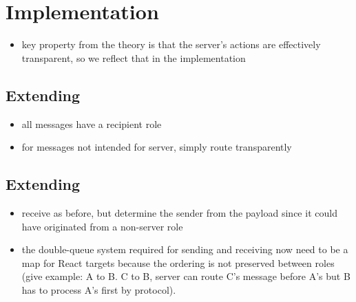 \chapter{Implementation}

\begin{itemize}
\item key property from the theory is that the server's actions are effectively transparent, so we reflect that in the implementation
\end{itemize}

\section{Extending }
\begin{itemize}
\item all messages have a recipient role
\item for messages not intended for server, simply route transparently
\end{itemize}

\section{Extending }
\begin{itemize}
\item receive as before, but determine the sender from the payload since it could have originated from a non-server role
\item the double-queue system required for sending and receiving now need to be a map for React targets because the ordering is not preserved between roles (give example: A to B. C to B, server can route C's message before A's but B has to process A's first by protocol).
\end{itemize}